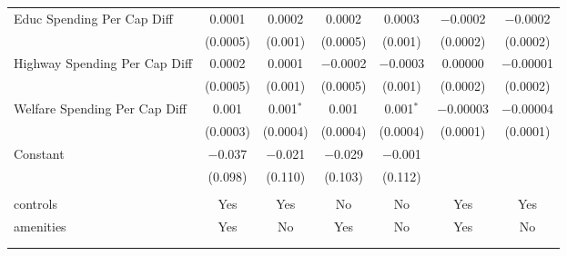 \begin{table}[!htbp]
\begin{tabular}{@{\extracolsep{5pt}}lcccccc}
  Educ Spending Per Cap Diff & 0.0001 & 0.0002 & 0.0002 & 0.0003 & $-$0.0002 & $-$0.0002 \\ 
  & (0.0005) & (0.001) & (0.0005) & (0.001) & (0.0002) & (0.0002) \\ 
  Highway Spending Per Cap Diff & 0.0002 & 0.0001 & $-$0.0002 & $-$0.0003 & 0.00000 & $-$0.00001 \\ 
  & (0.0005) & (0.001) & (0.0005) & (0.001) & (0.0002) & (0.0002) \\ 
  Welfare Spending Per Cap Diff & 0.001 & 0.001$^{*}$ & 0.001 & 0.001$^{*}$ & $-$0.00003 & $-$0.00004 \\ 
  & (0.0003) & (0.0004) & (0.0004) & (0.0004) & (0.0001) & (0.0001) \\ 
  Constant & $-$0.037 & $-$0.021 & $-$0.029 & $-$0.001 &  &  \\ 
  & (0.098) & (0.110) & (0.103) & (0.112) &  &  \\ 
 \hline \\[-1.8ex] 
controls & Yes & Yes & No & No & Yes & Yes \\ 
amenities & Yes & No & Yes & No & Yes & No \\ 
\hline \\[-1.8ex] 
\hline 
\hline \\[-1.8ex] 
\end{tabular} 
\end{table} 
